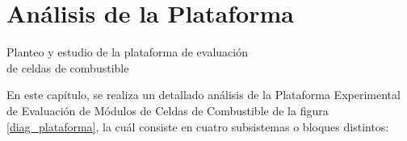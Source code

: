 \section{Análisis de la Plataforma} \label{analisis}
\thispagestyle{plain}

\vspace{0.5cm}

\Large\scshape
\begin{center}
    \textrm{Planteo y estudio de la plataforma de evaluación\\ de celdas de combustible}
\end{center}
\normalfont

\divider

En este capítulo, se realiza un detallado análisis de la Plataforma Experimental de Evaluación de Módulos de Celdas de Combustible de la figura \ref{diag_plataforma}, la cuál consiste en cuatro subsistemas o bloques distintos: 

